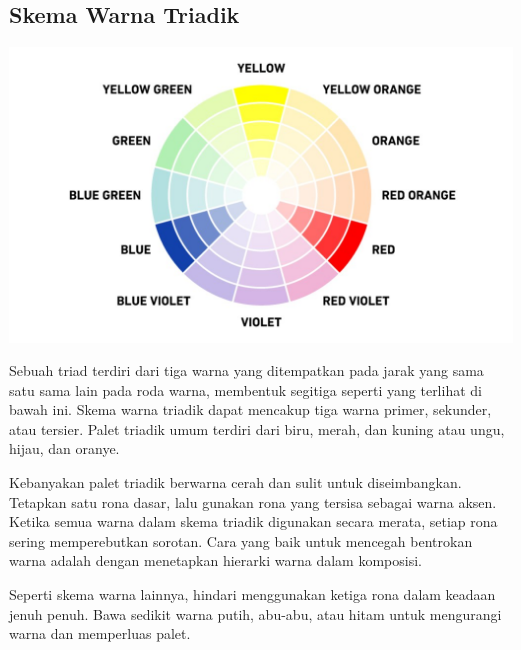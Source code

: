 \documentclass[a4paper]{article}
\begin{document}
\subsection{Skema Warna Triadik}
\begin{center}
  \includegraphics[width=\textwidth]{resources/triadic.jpg}
\end{center}
Sebuah triad terdiri dari tiga warna yang ditempatkan pada jarak yang sama satu sama lain pada roda warna, membentuk segitiga seperti yang terlihat di bawah ini. Skema warna triadik dapat mencakup tiga warna primer, sekunder, atau tersier. Palet triadik umum terdiri dari biru, merah, dan kuning atau ungu, hijau, dan oranye.

Kebanyakan palet triadik berwarna cerah dan sulit untuk diseimbangkan. Tetapkan satu rona dasar, lalu gunakan rona yang tersisa sebagai warna aksen. Ketika semua warna dalam skema triadik digunakan secara merata, setiap rona sering memperebutkan sorotan. Cara yang baik untuk mencegah bentrokan warna adalah dengan menetapkan hierarki warna dalam komposisi.

Seperti skema warna lainnya, hindari menggunakan ketiga rona dalam keadaan jenuh penuh. Bawa sedikit warna putih, abu-abu, atau hitam untuk mengurangi warna dan memperluas palet.
\end{document}
